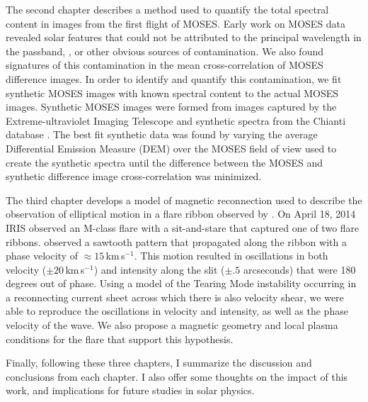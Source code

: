 The second chapter describes a method used to quantify the total spectral content in images from the first flight of MOSES.
Early work on MOSES data revealed solar features that could not be attributed to the principal wavelength in the passband, , or other obvious sources of contamination. 
We also found signatures of this contamination in the mean cross-correlation of MOSES difference images.
In order to identify and quantify this contamination, we fit synthetic MOSES images with known spectral content to the actual MOSES images.
Synthetic MOSES images were formed from images captured by the Extreme-ultraviolet Imaging Telescope \citep[EIT:][]{EIT} and synthetic spectra from the Chianti database \citep{ChiantiI,ChiantiX}.
The best fit synthetic data was found by varying the average Differential Emission Measure (DEM) over the MOSES field of view used to create the synthetic spectra until the difference between the MOSES and synthetic difference image cross-correlation was minimized.

The third chapter develops a model of magnetic reconnection used to describe the observation of elliptical motion in a flare ribbon observed by \citet{Brannon2015}.
On April 18, 2014 IRIS observed an M-class flare with a sit-and-stare that captured one of two flare ribbons.
\citet{Brannon2015} observed a sawtooth pattern that propagated along the ribbon with a phase velocity of $\approx15$\,km\,s$^{-1}$.
This motion resulted in oscillations in both velocity ($\pm20$\,km\,s$^{-1}$) and intensity along the slit ($\pm.5$ arcseconds) that were 180 degrees out of phase.
Using a model of the Tearing Mode instability \citep{FKR} occurring in a reconnecting current sheet across which there is also velocity shear, we were able to reproduce the oscillations in velocity and intensity, as well as the phase velocity of the wave.
We also propose a magnetic geometry and local plasma conditions for the flare that support this hypothesis.

Finally, following these three chapters, I summarize the discussion and conclusions from each chapter.
I also offer some thoughts on the impact of this work, and implications for future studies in solar physics.








